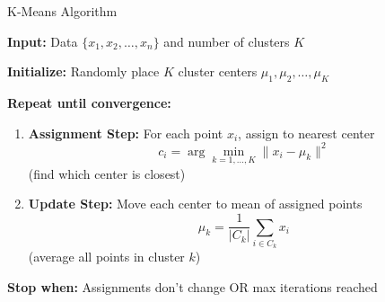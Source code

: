 \begin{frame}[allowframebreaks]{K-Means Algorithm}

\begin{tcolorbox}[colback=blue!5, colframe=blue!50, title=\textbf{K-Means Algorithm}]

\textbf{Input:} Data $\{x_1, x_2, \ldots, x_n\}$ and number of clusters $K$

\vspace{0.2em}
\textbf{Initialize:} Randomly place $K$ cluster centers $\mu_1, \mu_2, \ldots, \mu_K$

\vspace{0.2em}
\textbf{Repeat until convergence:}

\vspace{0.3em}
\begin{enumerate}
\item \textbf{Assignment Step:} For each point $x_i$, assign to nearest center
\[
c_i = \arg\min_{k=1,\ldots,K} \|x_i - \mu_k\|^2
\]
\small (find which center is closest)

\vspace{0.2em}
\item \textbf{Update Step:} Move each center to mean of assigned points
\[
\mu_k = \frac{1}{|C_k|} \sum_{i \in C_k} x_i
\]
\small (average all points in cluster $k$)
\end{enumerate}

\vspace{0.2em}
\textbf{Stop when:} Assignments don't change OR max iterations reached
\end{tcolorbox}

\end{frame}

